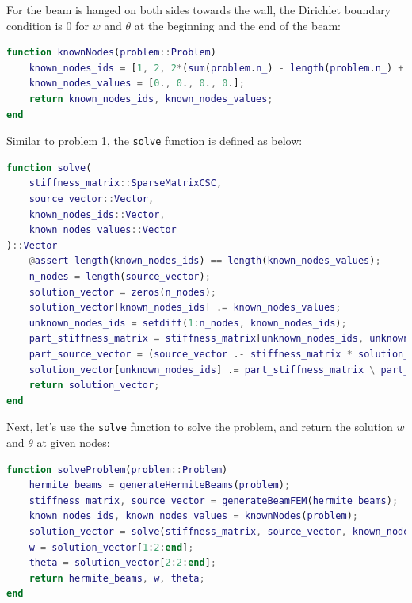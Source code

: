 For the beam is hanged on both sides towards the wall,
the Dirichlet boundary condition is $0$ for $w$ and $\theta$ 
at the beginning and the end of the beam:
\begin{lstlisting}[language=matlab]
function knownNodes(problem::Problem)
    known_nodes_ids = [1, 2, 2*(sum(problem.n_) - length(problem.n_) + 1)-1, 2*(sum(problem.n_) - length(problem.n_) + 1)];
    known_nodes_values = [0., 0., 0., 0.];
    return known_nodes_ids, known_nodes_values;
end
\end{lstlisting}

Similar to problem 1, 
the \verb|solve| function is defined as below:
\begin{lstlisting}[language=matlab]
function solve(
    stiffness_matrix::SparseMatrixCSC, 
    source_vector::Vector, 
    known_nodes_ids::Vector,
    known_nodes_values::Vector
)::Vector
    @assert length(known_nodes_ids) == length(known_nodes_values);
    n_nodes = length(source_vector);
    solution_vector = zeros(n_nodes);
    solution_vector[known_nodes_ids] .= known_nodes_values;
    unknown_nodes_ids = setdiff(1:n_nodes, known_nodes_ids);
    part_stiffness_matrix = stiffness_matrix[unknown_nodes_ids, unknown_nodes_ids];
    part_source_vector = (source_vector .- stiffness_matrix * solution_vector)[unknown_nodes_ids];
    solution_vector[unknown_nodes_ids] .= part_stiffness_matrix \ part_source_vector;
    return solution_vector;
end
\end{lstlisting}

Next, let's use the \verb|solve| function to solve the problem,
and return the solution $w$ and $\theta$ at given nodes:
\begin{lstlisting}[language=matlab]
function solveProblem(problem::Problem)
    hermite_beams = generateHermiteBeams(problem);
    stiffness_matrix, source_vector = generateBeamFEM(hermite_beams);
    known_nodes_ids, known_nodes_values = knownNodes(problem);
    solution_vector = solve(stiffness_matrix, source_vector, known_nodes_ids, known_nodes_values);
    w = solution_vector[1:2:end];
    theta = solution_vector[2:2:end];
    return hermite_beams, w, theta;
end
\end{lstlisting}

